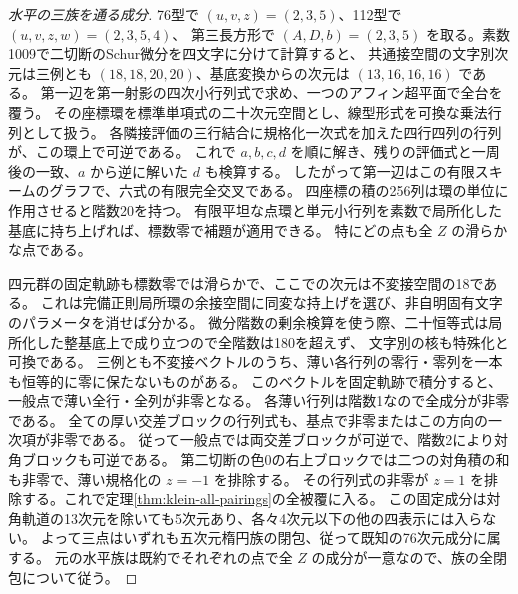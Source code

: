 \begin{proof}[水平の三族を通る成分]
76型で $(u,v,z)=(2,3,5)$、112型で $(u,v,z,w)=(2,3,5,4)$、
第三長方形で $(A,D,b)=(2,3,5)$ を取る。素数1009で二切断のSchur微分を四文字に分けて計算すると、
共通接空間の文字別次元は三例とも $(18,18,20,20)$、基底変換からの次元は $(13,16,16,16)$ である。
第一辺を第一射影の四次小行列式で求め、一つのアフィン超平面で全台を覆う。
その座標環を標準単項式の二十次元空間とし、線型形式を可換な乗法行列として扱う。
各隣接評価の三行結合に規格化一次式を加えた四行四列の行列が、この環上で可逆である。
これで $a,b,c,d$ を順に解き、残りの評価式と一周後の一致、$a$ から逆に解いた $d$ も検算する。
したがって第一辺はこの有限スキームのグラフで、六式の有限完全交叉である。
四座標の積の256列は環の単位に作用させると階数20を持つ。
有限平坦な点環と単元小行列を素数で局所化した基底に持ち上げれば、標数零で補題が適用できる。
特にどの点も全 $Z$ の滑らかな点である。

四元群の固定軌跡も標数零では滑らかで、ここでの次元は不変接空間の18である。
これは完備正則局所環の余接空間に同変な持上げを選び、非自明固有文字のパラメータを消せば分かる。
微分階数の剰余検算を使う際、二十恒等式は局所化した整基底上で成り立つので全階数は180を超えず、
文字別の核も特殊化と可換である。
三例とも不変接ベクトルのうち、薄い各行列の零行・零列を一本も恒等的に零に保たないものがある。
このベクトルを固定軌跡で積分すると、一般点で薄い全行・全列が非零となる。
各薄い行列は階数1なので全成分が非零である。
全ての厚い交差ブロックの行列式も、基点で非零またはこの方向の一次項が非零である。
従って一般点では両交差ブロックが可逆で、階数2により対角ブロックも可逆である。
第二切断の色0の右上ブロックでは二つの対角積の和も非零で、薄い規格化の $z=-1$ を排除する。
その行列式の非零が $z=1$ を排除する。これで定理\ref{thm:klein-all-pairings}の全被覆に入る。
この固定成分は対角軌道の13次元を除いても5次元あり、各々4次元以下の他の四表示には入らない。
よって三点はいずれも五次元楕円族の閉包、従って既知の76次元成分に属する。
元の水平族は既約でそれぞれの点で全 $Z$ の成分が一意なので、族の全閉包について従う。
\end{proof}

